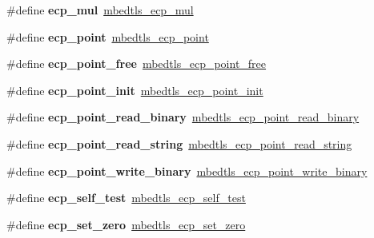 \begin{DoxyCompactItemize}
\#define {\bfseries ecp\+\_\+mul}~\mbox{\hyperlink{ecp_8h_a4d005045c302e100c78bdc587e8f0e6a}{mbedtls\+\_\+ecp\+\_\+mul}}
\item 
\mbox{\label{compat-1_83_8h_ab712d821840b9e5f31f045d939b62791}} 
\#define {\bfseries ecp\+\_\+point}~\mbox{\hyperlink{structmbedtls__ecp__point}{mbedtls\+\_\+ecp\+\_\+point}}
\item 
\mbox{\label{compat-1_83_8h_a9fc0e6255e9ea66d37e95a525f807d69}} 
\#define {\bfseries ecp\+\_\+point\+\_\+free}~\mbox{\hyperlink{ecp_8h_a87004f74814cc59a9ef757aea444098d}{mbedtls\+\_\+ecp\+\_\+point\+\_\+free}}
\item 
\mbox{\label{compat-1_83_8h_abbefc5337c6b7062bb11814e7e2f0a06}} 
\#define {\bfseries ecp\+\_\+point\+\_\+init}~\mbox{\hyperlink{ecp_8h_ae069f80bc2f9cf2215c34430a9ccd924}{mbedtls\+\_\+ecp\+\_\+point\+\_\+init}}
\item 
\mbox{\label{compat-1_83_8h_af6198afce085ab05667428f45ca579af}} 
\#define {\bfseries ecp\+\_\+point\+\_\+read\+\_\+binary}~\mbox{\hyperlink{ecp_8h_a08eb064f95d4ebd2d7822234f7b64b4d}{mbedtls\+\_\+ecp\+\_\+point\+\_\+read\+\_\+binary}}
\item 
\mbox{\label{compat-1_83_8h_a5a4860d3380f631d0001990aef8b1a27}} 
\#define {\bfseries ecp\+\_\+point\+\_\+read\+\_\+string}~\mbox{\hyperlink{ecp_8h_a63bfda35c538b840a78371be788675dd}{mbedtls\+\_\+ecp\+\_\+point\+\_\+read\+\_\+string}}
\item 
\mbox{\label{compat-1_83_8h_ae5aff48664421b5386b0e9f7ee1eddec}} 
\#define {\bfseries ecp\+\_\+point\+\_\+write\+\_\+binary}~\mbox{\hyperlink{ecp_8h_af7d35a6631f662cc279eed8c4f0f7ba6}{mbedtls\+\_\+ecp\+\_\+point\+\_\+write\+\_\+binary}}
\item 
\mbox{\label{compat-1_83_8h_a515115f10d0004381ea60ccd66bf505a}} 
\#define {\bfseries ecp\+\_\+self\+\_\+test}~\mbox{\hyperlink{ecp_8h_af869b14c9dcd0d4314151caee7d7e50e}{mbedtls\+\_\+ecp\+\_\+self\+\_\+test}}
\item 
\mbox{\label{compat-1_83_8h_ad9bdec2d294d471a9b235b06be63fa2a}} 
\#define {\bfseries ecp\+\_\+set\+\_\+zero}~\mbox{\hyperlink{ecp_8h_ac18b1dfe4223ac6dc6c637b2edc4a481}{mbedtls\+\_\+ecp\+\_\+set\+\_\+zero}}

\end{DoxyCompactItemize}
